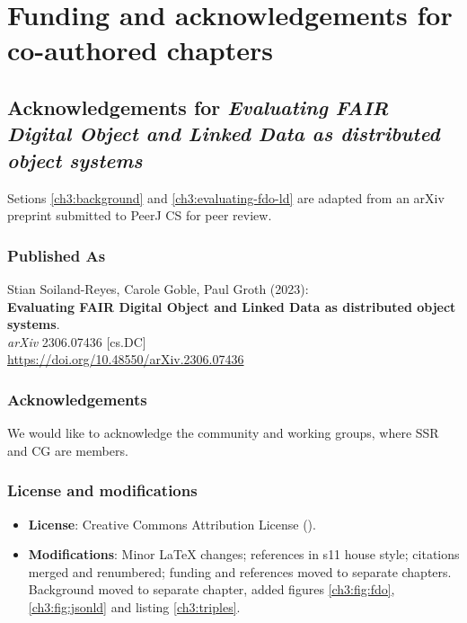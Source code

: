 \section{Funding and acknowledgements for co-authored chapters}


\subsection{Acknowledgements for \textit{Evaluating FAIR Digital Object and Linked Data as distributed object systems}}\label{ch11:fdo}

Setions \vref{ch3:background} and \vref{ch3:evaluating-fdo-ld} are adapted from an arXiv preprint submitted to PeerJ CS for peer review.

\subsubsection*{Published As}

Stian Soiland-Reyes, Carole Goble, Paul Groth (2023):\\
\textbf{Evaluating FAIR Digital Object and Linked Data as distributed object systems}.\\
\emph{arXiv} 2306.07436 [cs.DC] \\
\url{https://doi.org/10.48550/arXiv.2306.07436}

\subsubsection*{Acknowledgements}

We would like to acknowledge the  community and working groups, where SSR and CG are members.


\subsubsection*{License and modifications}

\begin{itemize}
\tightlist
\item
  \textbf{License}: Creative Commons Attribution License
  ().
\item
  \textbf{Modifications}: Minor LaTeX changes; references in s11 house style; 
  citations merged and renumbered; 
  funding and references moved to separate chapters. Background moved to separate chapter, 
  added figures \ref{ch3:fig:fdo}, \ref{ch3:fig:jsonld} and listing \ref{ch3:triples}.
\end{itemize}

